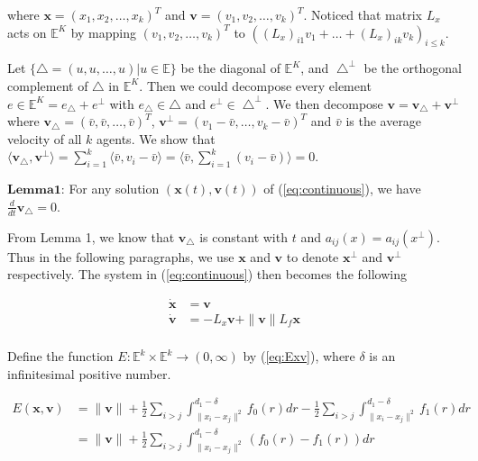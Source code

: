 \noindent
where $\mathbf{x}=(x_1, x_2, \dots, x_k)^T$ and $\mathbf{v}=(v_1, v_2, \dots, v_k)^T$. Noticed that matrix $L_x$ acts on $\mathbb{E}^K$ by mapping $(v_1, v_2, \dots, v_k)^T$ to $((L_x)_{i1}v_1+\dots+(L_x)_{ik}v_k)_{i\leq k}$.

Let $\{\bigtriangleup={(u, u, \dots, u)|u\in\mathbb{E}}\}$ be the diagonal of $\mathbb{E}^K$, and $\bigtriangleup^{\perp}$ be the orthogonal complement of $\bigtriangleup$ in $\mathbb{E}^K$. Then we could decompose every element $e\in\mathbb{E}^K=e_{\bigtriangleup}+e^{\perp}$ with $e_{\bigtriangleup}\in\bigtriangleup$ and $e^{\perp}\in\bigtriangleup^{\perp}$. We then decompose $\mathbf{v}=\mathbf{v_{\bigtriangleup}+v^{\perp}}$ where $\mathbf{v_{\bigtriangleup}}=(\bar{v}, \bar{v}, \dots, \bar{v})^T$, $\mathbf{v^{\perp}}=(v_1-\bar{v}, \dots, v_k-\bar{v})^T$ and $\bar{v}$ is the average velocity of all $k$ agents. We show that $\langle\mathbf{v_{\bigtriangleup}}, \mathbf{v^{\perp}}\rangle=\sum_{i=1}^k\langle\bar{v},v_i-\bar{v}\rangle=\langle\bar{v},\sum_{i=1}^k(v_i-\bar{v})\rangle=0$.

$\mathbf{Lemma 1}$: For any solution $(\mathbf{x}(t), \mathbf{v}(t))$ of (\ref{eq:continuous}), we have $\frac{d}{dt}\mathbf{v}_{\bigtriangleup}=0$.

From Lemma 1, we know that $\mathbf{v_{\bigtriangleup}}$ is constant with $t$ and $a_{ij}(x)=a_{ij}(x^{\perp})$. Thus in the following paragraphs, we use $\mathbf{x}$ and $\mathbf{v}$ to denote $\mathbf{x}^{\perp}$ and $\mathbf{v}^{\perp}$ respectively. The system in (\ref{eq:continuous}) then becomes the following

\begin{equation}\label{eq:continuous_projection}
\begin{aligned}
\mathbf{\dot{x}}&=\mathbf{v}\\
\mathbf{\dot{v}}&=-L_x\mathbf{v}+\|\mathbf{v}\|L_f\mathbf{x}\\
\end{aligned}
\end{equation}

Define the function $E: \mathbb{E}^k\times\mathbb{E}^k\to(0,\infty)$ by (\ref{eq:Exv}), where $\delta$ is an infinitesimal positive number.

\begin{equation}\label{eq:Exv}
\begin{aligned}
E(\mathbf{x}, \mathbf{v})&=\|\mathbf{v}\|+\frac{1}{2}\sum_{i>j}\int_{\|x_i-x_j\|^2}^{d_1-\delta}f_0(r)dr-\frac{1}{2}\sum_{i>j}\int_{\|x_i-x_j\|^2}^{d_1-\delta}f_1(r)dr\\
&=\|\mathbf{v}\|+\frac{1}{2}\sum_{i>j}\int_{\|x_i-x_j\|^2}^{d_1-\delta}(f_0(r)-f_1(r))dr
\end{aligned}
\end{equation}

